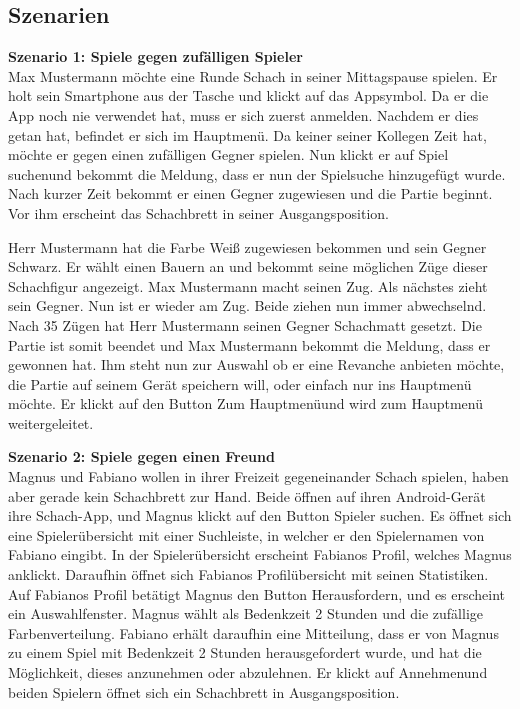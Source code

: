 \documentclass[parskip=full]{scrartcl}
\begin{document}
\subsection{Szenarien}
\textbf{Szenario 1: \glqq Spiele gegen zufälligen Spieler\grqq} \\
Max Mustermann möchte eine Runde Schach in seiner Mittagspause spielen. Er holt sein Smartphone aus der Tasche und klickt auf das Appsymbol.
Da er die App noch nie verwendet hat, muss er sich zuerst anmelden. Nachdem er dies getan hat, befindet er sich im Hauptmenü.
Da keiner seiner Kollegen Zeit hat, möchte er gegen einen zufälligen Gegner spielen. Nun klickt er auf \glqq Spiel suchen\grqq und bekommt die Meldung, dass er nun der Spielsuche hinzugefügt wurde.
Nach kurzer Zeit bekommt er einen Gegner zugewiesen und die Partie beginnt. Vor ihm erscheint das \gls{Schachbrett} in seiner \gls{Ausgangsposition}.

Herr Mustermann hat die Farbe Weiß zugewiesen bekommen und sein Gegner Schwarz. Er wählt einen Bauern an und bekommt seine möglichen Züge dieser \gls{Schachfigur} angezeigt.
Max Mustermann macht seinen Zug. Als nächstes zieht sein Gegner. Nun ist er wieder am Zug. Beide ziehen nun immer abwechselnd. Nach 35 Zügen hat Herr Mustermann
seinen Gegner \gls{Schachmatt} gesetzt. Die Partie ist somit beendet und Max Mustermann bekommt die Meldung, dass er gewonnen hat. Ihm steht nun zur Auswahl ob er eine Revanche anbieten möchte, die Partie auf seinem Gerät speichern will, oder einfach nur ins Hauptmenü möchte. Er klickt auf den Button \glqq Zum Hauptmenü\grqq und wird zum Hauptmenü weitergeleitet.

\textbf{Szenario 2: \glqq Spiele gegen einen Freund\grqq} \\
Magnus und Fabiano wollen in ihrer Freizeit gegeneinander Schach spielen, haben aber gerade kein Schachbrett zur Hand. Beide öffnen auf ihren \gls{Android}-Gerät ihre Schach-App, und Magnus klickt auf den Button \glqq Spieler suchen\grqq. Es öffnet sich eine Spielerübersicht mit einer Suchleiste, in welcher er den Spielernamen von Fabiano eingibt. In der Spielerübersicht erscheint Fabianos Profil, welches Magnus anklickt. Daraufhin öffnet sich Fabianos Profilübersicht mit seinen Statistiken. Auf Fabianos Profil betätigt Magnus den Button \glqq Herausfordern\grqq, und es erscheint ein Auswahlfenster. Magnus wählt als \gls{Bedenkzeit} 2 Stunden und die zufällige Farbenverteilung. Fabiano erhält daraufhin eine Mitteilung, dass er von Magnus zu einem Spiel mit \gls{Bedenkzeit} 2 Stunden herausgefordert wurde, und hat die Möglichkeit, dieses anzunehmen oder abzulehnen. Er klickt auf \glqq Annehmen\grqq und beiden Spielern öffnet sich ein \gls{Schachbrett} in \gls{Ausgangsposition}.
\end{document}
